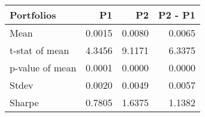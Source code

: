 \begin{tabular}{lrrr}
\toprule
Portfolios & P1 & P2 & P2 - P1 \\
\midrule
Mean & 0.0015 & 0.0080 & 0.0065 \\
t-stat of mean & 4.3456 & 9.1171 & 6.3375 \\
p-value of mean & 0.0001 & 0.0000 & 0.0000 \\
Stdev & 0.0020 & 0.0049 & 0.0057 \\
Sharpe & 0.7805 & 1.6375 & 1.1382 \\
\bottomrule
\end{tabular}
